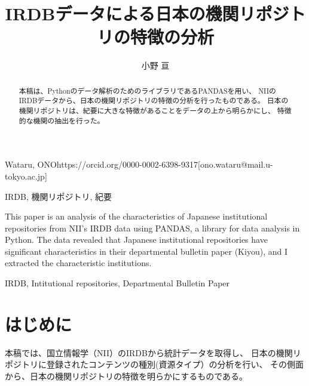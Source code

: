 \documentclass[submit,noauthor]{ono}
\begin{document}
\title{IRDBデータによる日本の機関リポジトリの特徴の分析\\}



\author{小野 亘}{Wataru, ONO}{https://orcid.org/0000-0002-6398-9317}[ono.wataru@mail.u-tokyo.ac.jp]

\begin{abstract}
本稿は、Pythonのデータ解析のためのライブラリであるPANDASを用い、
NIIのIRDBデータから、日本の機関リポジトリの特徴の分析を行ったものである。
日本の機関リポジトリは、紀要に大きな特徴があることをデータの上から明らかにし、
特徴的な機関の抽出を行った。
\end{abstract}


\begin{jkeyword}
	IRDB, 機関リポジトリ, 紀要
\end{jkeyword}

\begin{eabstract}
This paper is an analysis of the characteristics of Japanese institutional
 repositories from NII's IRDB data using PANDAS, 
 a library for data analysis in Python.
 The data revealed that Japanese institutional repositories have 
 significant characteristics in their departmental bulletin paper (Kiyou), 
 and I extracted the characteristic institutions.
\end{eabstract}

\begin{ekeyword}
	IRDB, Intitutional repositories, Departmental Bulletin Paper
\end{ekeyword}

\maketitle

\section{はじめに}

本稿では、国立情報学（NII）のIRDBから統計データを取得し、
日本の機関リポジトリに登録されたコンテンツの種別(資源タイプ）の分析を行い、
その側面から、日本の機関リポジトリの特徴を明らかにするものである。
\end{document}
